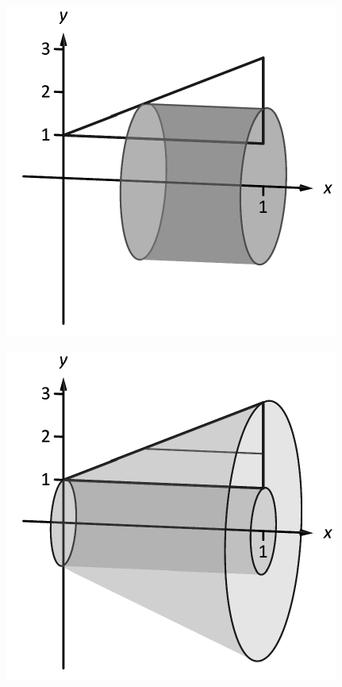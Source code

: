 \documentclass[10pt]{article}
\begin{document}
\includegraphics{figshell3b_3DBW.pdf}
\texttt{}

\includegraphics{figshell3c_3DBW.pdf}
\texttt{}
\end{document}
